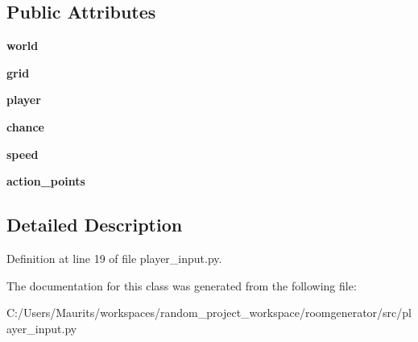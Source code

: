 \subsection*{Public Attributes}
\begin{DoxyCompactItemize}
\item 
\hypertarget{classplayer__input_1_1_object_spawner_a41e40e3231b7ba9e2aa0d26bce72a266}{}{\bfseries world}\label{classplayer__input_1_1_object_spawner_a41e40e3231b7ba9e2aa0d26bce72a266}

\item 
\hypertarget{classplayer__input_1_1_object_spawner_a2a8621cdcfb39f29ad6a0bc41c67b333}{}{\bfseries grid}\label{classplayer__input_1_1_object_spawner_a2a8621cdcfb39f29ad6a0bc41c67b333}

\item 
\hypertarget{classplayer__input_1_1_object_spawner_a058c9f3cd9932bc3f3691731de630d6d}{}{\bfseries player}\label{classplayer__input_1_1_object_spawner_a058c9f3cd9932bc3f3691731de630d6d}

\item 
\hypertarget{classplayer__input_1_1_object_spawner_a1b81443f9495fca149dc4b0f4e61e35c}{}{\bfseries chance}\label{classplayer__input_1_1_object_spawner_a1b81443f9495fca149dc4b0f4e61e35c}

\item 
\hypertarget{classplayer__input_1_1_object_spawner_a74d11c890c7cf0a30adb646d3007a9d5}{}{\bfseries speed}\label{classplayer__input_1_1_object_spawner_a74d11c890c7cf0a30adb646d3007a9d5}

\item 
\hypertarget{classplayer__input_1_1_object_spawner_aac783605e84fc97384582fa231c0ad30}{}{\bfseries action\+\_\+points}\label{classplayer__input_1_1_object_spawner_aac783605e84fc97384582fa231c0ad30}

\end{DoxyCompactItemize}


\subsection{Detailed Description}


Definition at line 19 of file player\+\_\+input.\+py.



The documentation for this class was generated from the following file\+:\begin{DoxyCompactItemize}
\item 
C\+:/\+Users/\+Maurits/workspaces/random\+\_\+project\+\_\+workspace/roomgenerator/src/player\+\_\+input.\+py\end{DoxyCompactItemize}
